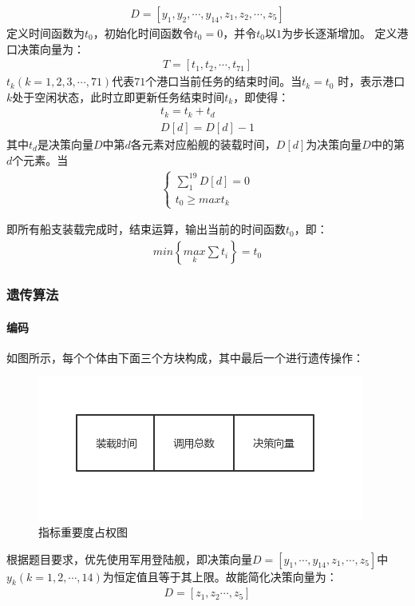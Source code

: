 \documentclass{whutmod}
\begin{document}
		\begin{gather*}
	 D=[y_{1},y_{2},\cdots,y_{14},z_{1},z_{2},\cdots,z_{5}]
		\end{gather*}
	定义时间函数为$t_{0}$，初始化时间函数令$t_{0}=0$，并令$t_{0}$以$1$为步长逐渐增加。
	定义港口决策向量为：
		\begin{gather*}
		T=[t_{1},t_{2},\cdots,t_{71}]
		\end{gather*}
	$t_{k}(k=1,2,3,\cdots,71)$代表$71$个港口当前任务的结束时间。当$t_{k}=t_{0}$ 时，表示港口$k$处于空闲状态，此时立即更新任务结束时间$t_{k}$，即使得：
		\begin{gather*}
		t_{k}=t_{k}+t_{d}\\
		D[d]=D[d]-1
		\end{gather*}
	其中$t_{d}$是决策向量$D$中第$d$各元素对应船舰的装载时间，$D[d]$为决策向量$D$中的第$d$个元素。当
		\begin{gather*}
	\left\{\begin{matrix} \sum_{1}^{19}D[d]=0
	\\t_{0}\geqslant max t_{k} 	
	\end{matrix}\right.
		\end{gather*}

		
		即所有船支装载完成时，结束运算，输出当前的时间函数$t_{0}$，即：
			\begin{gather*}
		min \left \{ \underset{k}{max}\sum t_{i} \right \}=t_{0}
			\end{gather*}

	\subsubsection{遗传算法}
	 \paragraph{编码}
	 如图所示，每个个体由下面三个方块构成，其中最后一个进行遗传操作：
	 	\begin{figure}[H]
	 	\centering
	 	\includegraphics[width=.7\textwidth]{figures/yichuan.png}
	 	\caption{指标重要度占权图}\label{yichuan}
	 	 \end{figure}
	 根据题目要求，优先使用军用登陆舰，即决策向量$D=[y_{1},\cdots,y_{14},z_{1},\cdots,z_{5}]$中$y_{k}(k=1,2,\cdots,14)$为恒定值且等于其上限。故能简化决策向量为：
	\begin{gather*}
	D=[z_{1},z_{2}\cdots,z_{5}]
	\end{gather*}
\end{document}
